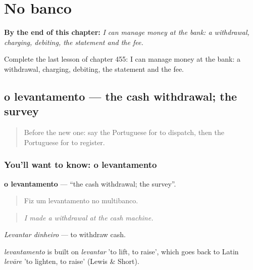 
\chapter{No banco}
\label{ch:pt-no-banco}

\begin{chapteropening}
\textbf{By the end of this chapter:} \emph{I can manage money at the bank: a withdrawal, charging, debiting, the statement and the fee.}

Complete the last lesson of chapter 455: I can manage money at the bank: a withdrawal, charging, debiting, the statement and the fee.
\end{chapteropening}

\section[o levantamento]{o levantamento — the cash withdrawal; the survey}

\label{lesson:PT-C455-levantamento}



\begin{quote}
Before the new one: say the Portuguese for to dispatch, then the Portuguese for to register.
\end{quote}

\subsection*{You'll want to know: o levantamento}
\textbf{o levantamento} — \textquotedblleft{}the cash withdrawal; the survey\textquotedblright{}.

\begin{quote}
Fiz um levantamento no multibanco.
\end{quote}

\begin{quote}
\emph{I made a withdrawal at the cash machine.}
\end{quote}

\emph{Levantar dinheiro} — to withdraw cash.

\begin{cousinweb}
\emph{levantamento} is built on \emph{levantar} 'to lift, to raise', which goes back to Latin \emph{levāre} 'to lighten, to raise' (Lewis \& Short).
\end{cousinweb}

